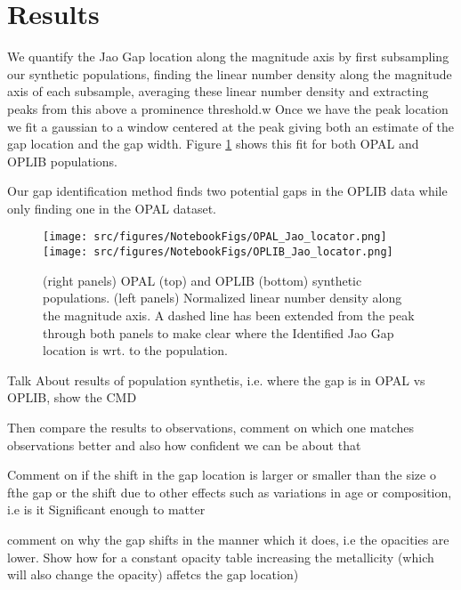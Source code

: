 \section{Results}\label{sec:results}
We quantify the Jao Gap location along the magnitude axis by first subsampling
our synthetic populations, finding the linear number density along the
magnitude axis of each subsample, averaging these linear number density and
extracting peaks from this above a prominence threshold.w Once we have the peak
location we fit a gaussian to a window centered at the peak giving both an
estimate of the gap location and the gap width. Figure \ref{fig:JaoGapLocator}
shows this fit for both OPAL and OPLIB populations.

Our gap identification method finds two potential gaps in the OPLIB data while
only finding one in the OPAL dataset. 

\begin{figure}
	\centering
	\texttt{[image: src/figures/NotebookFigs/OPAL\_Jao\_locator.png]}
	\texttt{[image: src/figures/NotebookFigs/OPLIB\_Jao\_locator.png]}
	\caption{(right panels) OPAL (top) and OPLIB (bottom) synthetic
	populations. (left panels) Normalized linear number density along the
	magnitude axis. A dashed line has been extended from the peak through both
	panels to make clear where the Identified Jao Gap location is wrt. to the
	population. }
	\label{fig:JaoGapLocator}
\end{figure}



{\color{red} Talk About results of population synthetis, i.e. where the gap is
in OPAL vs OPLIB, show the CMD}

{\color{red} Then compare the results to observations, comment on which one
matches observations better and also how confident we can be about that}

{\color{red} Comment on if the shift in the gap location is larger or smaller
than the size o fthe gap or the shift due to other effects such as variations
in age or composition, i.e is it Significant enough to matter}

{\color{red} comment on why the gap shifts in the manner which it does, i.e the
opacities are lower. Show how for a constant opacity table increasing the
metallicity (which will also change the opacity) affetcs the gap location)}
